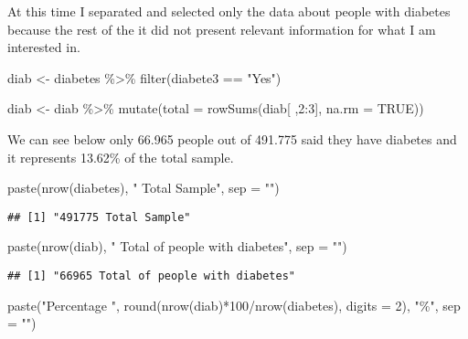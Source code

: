 \documentclass[
]{article}
\newenvironment{Shaded}{\begin{snugshade}}{\end{snugshade}}
\newcommand{\AttributeTok}[1]{\textcolor[rgb]{0.77,0.63,0.00}{#1}}
\newcommand{\ConstantTok}[1]{\textcolor[rgb]{0.00,0.00,0.00}{#1}}
\newcommand{\DecValTok}[1]{\textcolor[rgb]{0.00,0.00,0.81}{#1}}
\newcommand{\FunctionTok}[1]{\textcolor[rgb]{0.00,0.00,0.00}{#1}}
\newcommand{\NormalTok}[1]{#1}
\newcommand{\OtherTok}[1]{\textcolor[rgb]{0.56,0.35,0.01}{#1}}
\newcommand{\SpecialCharTok}[1]{\textcolor[rgb]{0.00,0.00,0.00}{#1}}
\newcommand{\StringTok}[1]{\textcolor[rgb]{0.31,0.60,0.02}{#1}}
\begin{document}
At this time I separated and selected only the data about people with
diabetes because the rest of the it did not present relevant information
for what I am interested in.

\begin{Shaded}
\begin{Highlighting}[]
\NormalTok{diab }\OtherTok{\textless{}{-}}\NormalTok{ diabetes }\SpecialCharTok{\%\textgreater{}\%} 
  \FunctionTok{filter}\NormalTok{(diabete3 }\SpecialCharTok{==} \StringTok{"Yes"}\NormalTok{) }

\NormalTok{diab }\OtherTok{\textless{}{-}}\NormalTok{ diab }\SpecialCharTok{\%\textgreater{}\%}
  \FunctionTok{mutate}\NormalTok{(}\AttributeTok{total =} \FunctionTok{rowSums}\NormalTok{(diab[ ,}\DecValTok{2}\SpecialCharTok{:}\DecValTok{3}\NormalTok{], }\AttributeTok{na.rm =} \ConstantTok{TRUE}\NormalTok{)) }
\end{Highlighting}
\end{Shaded}

We can see below only 66.965 people out of 491.775 said they have
diabetes and it represents 13.62\% of the total sample.

\begin{Shaded}
\begin{Highlighting}[]
\FunctionTok{paste}\NormalTok{(}\FunctionTok{nrow}\NormalTok{(diabetes), }\StringTok{" Total Sample"}\NormalTok{, }\AttributeTok{sep =} \StringTok{""}\NormalTok{) }
\end{Highlighting}
\end{Shaded}

\begin{verbatim}
## [1] "491775 Total Sample"
\end{verbatim}

\begin{Shaded}
\begin{Highlighting}[]
\FunctionTok{paste}\NormalTok{(}\FunctionTok{nrow}\NormalTok{(diab), }\StringTok{" Total of people with diabetes"}\NormalTok{, }\AttributeTok{sep =} \StringTok{""}\NormalTok{)}
\end{Highlighting}
\end{Shaded}

\begin{verbatim}
## [1] "66965 Total of people with diabetes"
\end{verbatim}

\begin{Shaded}
\begin{Highlighting}[]
\FunctionTok{paste}\NormalTok{(}\StringTok{"Percentage "}\NormalTok{, }\FunctionTok{round}\NormalTok{(}\FunctionTok{nrow}\NormalTok{(diab)}\SpecialCharTok{*}\DecValTok{100}\SpecialCharTok{/}\FunctionTok{nrow}\NormalTok{(diabetes), }\AttributeTok{digits =} \DecValTok{2}\NormalTok{), }\StringTok{"\%"}\NormalTok{, }\AttributeTok{sep =} \StringTok{""}\NormalTok{)}
\end{Highlighting}
\end{Shaded}
\end{document}
